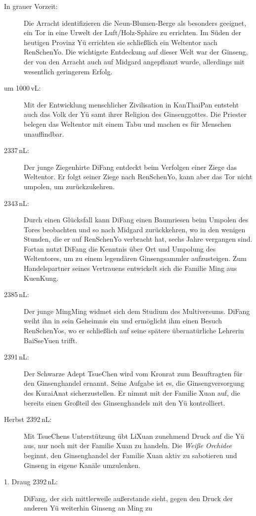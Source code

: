 \documentclass[
a4paper,
twoside,
DIV=calc,
BCOR=4mm,
fontsize=9pt,
twocolumn=on,
titlepage=on,
parskip=half
]{scrartcl}
\begin{document}
\begin{description}
\item[In grauer Vorzeit:] Die Arracht identifizieren die
  Neun-Blumen-Berge als besonders geeignet, ein Tor in eine Urwelt der
  Luft/Holz-Sphäre zu errichten. Im Süden der heutigen Provinz Yü
  errichten sie schließlich ein Weltentor nach RenSchenYo. Die
  wichtigste Entdeckung auf dieser Welt war der Ginseng, der von den
  Arracht auch auf Midgard angepflanzt wurde, allerdings mit wesentlich
  geringerem Erfolg.
\item[um 1000\,vL:] Mit der Entwicklung menschlicher Zivilisation in
  KanThaiPan entsteht auch das Volk der Yü samt ihrer Religion des
  Ginsenggottes. Die Priester belegen das Weltentor mit einem Tabu und
  machen es für Menschen unauffindbar.
\item[2337\,nL:] Der junge Ziegenhirte DiFang entdeckt beim Verfolgen
  einer Ziege das Weltentor. Er folgt seiner Ziege nach RenSchenYo,
  kann aber das Tor nicht umpolen, um zurückzukehren.
\item[2343\,nL:] Durch einen Glücksfall kann DiFang einen Baumriesen
  beim Umpolen des Tores beobachten und so nach Midgard zurückkehren,
  wo in den wenigen Stunden, die er auf RenSchenYo verbracht hat,
  sechs Jahre vergangen sind. Fortan nutzt DiFang die Kenntnis über
  Ort und Umpolung des Weltentores, um zu einem legendären
  Ginsengsammler aufzusteigen. Zum Handelspartner seines Vertrauens
  entwickelt sich die Familie Ming aus KuenKung.
\item[2385\,nL:] Der junge MingMing widmet sich dem Studium des
  Multiversums. DiFang weiht ihn in sein Geheimnis ein und ermöglicht
  ihm einen Besuch RenSchenYos, wo er schließlich auf seine spätere
  übernatürliche Lehrerin BaiSseYuen trifft.
\item[2391\,nL:] Der Schwarze Adept TsueChen wird vom Kronrat zum
  Beauftragten für den Ginsenghandel ernannt. Seine Aufgabe ist es,
  die Ginsengversorgung des KuraiAnat sicherzustellen. Er nimmt mit
  der Familie Xuan auf, die bereits einen Großteil des Ginsenghandels
  mit den Yü kontrolliert.
\item[Herbst 2392\,nL:] Mit TsueChens Unterstützung übt LiXuan
  zunehmend Druck auf die Yü aus, nur noch mit der Familie Xuan zu
  handeln. Die \emph{Weiße Orchidee} beginnt, den Ginsenghandel der
  Familie Xuan aktiv zu sabotieren und Ginseng in eigene Kanäle
  umzulenken.
\item[1. Draug 2392\,nL:] DiFang, der sich mittlerweile außerstande
  sieht, gegen den Druck der anderen Yü weiterhin Ginseng an Ming zu

\end{description}
\end{document}
